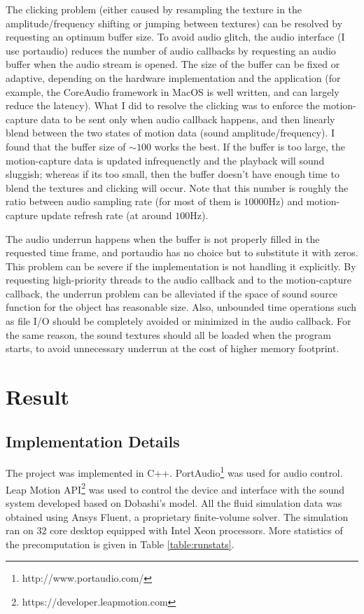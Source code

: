 \documentclass[tog]{acmsiggraph}
\begin{document}
The clicking problem (either caused by resampling the texture in the amplitude/frequency shifting or jumping between textures) can be resolved by requesting an optimum buffer size. To avoid audio glitch, the audio interface (I use portaudio) reduces the number of audio callbacks by requesting an audio buffer when the audio stream is opened. The size of the buffer can be fixed or adaptive, depending on the hardware implementation and the application (for example, the CoreAudio framework in MacOS is well written, and can largely reduce the latency). What I did to resolve the clicking was to enforce the motion-capture data to be sent only when audio callback happens, and then linearly blend between the two states of motion data (sound amplitude/frequency). I found that the buffer size of $\sim100$ works the best. If the buffer is too large, the motion-capture data is updated infrequenctly and the playback will sound sluggish; whereas if its too small, then the buffer doesn't have enough time to blend the textures and clicking will occur. Note that this number is roughly the ratio between audio sampling rate (for most of them is $10000$Hz) and motion-capture update refresh rate (at around $100$Hz).

The audio underrun happens when the buffer is not properly filled in the requested time frame, and portaudio has no choice but to substitute it with zeros. This problem can be severe if the implementation is not handling it explicitly. By requesting high-priority threads to the audio callback and to the motion-capture callback, the underrun problem can be alleviated if the space of sound source function for the object has reasonable size. Also, unbounded time operations such as file I/O should be completely avoided or minimized in the audio callback. For the same reason, the sound textures should all be loaded when the program starts, to avoid unnecessary underrun at the cost of higher memory footprint.


\section{Result} 

\subsection{Implementation Details} 

The project was implemented in C++. PortAudio\footnote{http://www.portaudio.com/} was used for audio control. Leap Motion API\footnote{https://developer.leapmotion.com} was used to control the device and interface with the sound system developed based on Dobashi's model. All the fluid simulation data was obtained using Ansys Fluent, a proprietary finite-volume solver. The simulation ran on 32 core desktop equipped with Intel Xeon processors. More statistics of the precomputation is given in Table \ref{table:runstats}.
\end{document}
